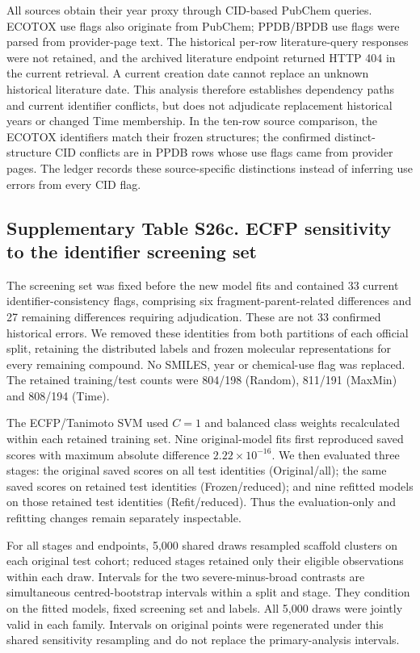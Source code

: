 All sources obtain their year proxy through CID-based PubChem
queries. ECOTOX use flags also originate from PubChem; PPDB/BPDB use flags were
parsed from provider-page text. The historical per-row literature-query responses
were not retained, and the archived literature endpoint returned HTTP 404 in the
current retrieval. A current creation date cannot replace an unknown historical
literature date. This analysis therefore establishes dependency paths and current
identifier conflicts, but does not adjudicate replacement historical years or
changed Time membership. In the ten-row source comparison, the ECOTOX identifiers match
their frozen structures; the confirmed distinct-structure CID conflicts are in
PPDB rows whose use flags came from provider pages. The ledger records these
source-specific distinctions instead of inferring use errors from every CID flag.

\subsection*{Supplementary Table S26c. ECFP sensitivity to the identifier screening set}

The screening set was fixed before the new model fits and contained 33 current identifier-consistency flags, comprising six fragment-parent-related differences and 27 remaining differences requiring adjudication. These are not 33 confirmed historical errors. We removed these identities from both partitions of each official split, retaining the distributed labels and frozen molecular representations for every remaining compound. No SMILES, year or chemical-use flag was replaced. The retained training/test counts were 804/198 (Random), 811/191 (MaxMin) and 808/194 (Time).

The ECFP/Tanimoto SVM used $C=1$ and balanced class weights recalculated within each retained training set. Nine original-model fits first reproduced saved scores with maximum absolute difference $2.22\times10^{-16}$. We then evaluated three stages: the original saved scores on all test identities (Original/all); the same saved scores on retained test identities (Frozen/reduced); and nine refitted models on those retained test identities (Refit/reduced). Thus the evaluation-only and refitting changes remain separately inspectable.

For all stages and endpoints, 5,000 shared draws resampled scaffold clusters on each original test cohort; reduced stages retained only their eligible observations within each draw. Intervals for the two severe-minus-broad contrasts are simultaneous centred-bootstrap intervals within a split and stage. They condition on the fitted models, fixed screening set and labels. All 5,000 draws were jointly valid in each family. Intervals on original points were regenerated under this shared sensitivity resampling and do not replace the primary-analysis intervals.

